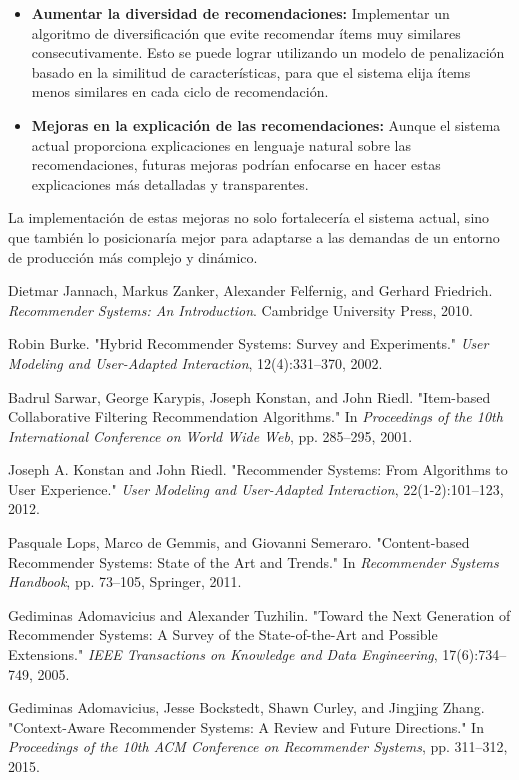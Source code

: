 \documentclass{llncs}
\begin{document}
\begin{itemize}
			\item \textbf{Aumentar la diversidad de recomendaciones:} Implementar un algoritmo de diversificación que evite recomendar ítems muy similares consecutivamente. Esto se puede lograr utilizando un modelo de penalización basado en la similitud de características, para que el sistema elija ítems menos similares en cada ciclo de recomendación.
		
		\item \textbf{Mejoras en la explicación de las recomendaciones:} Aunque el sistema actual proporciona explicaciones en lenguaje natural sobre las recomendaciones, futuras mejoras podrían enfocarse en hacer estas explicaciones más detalladas y transparentes.
		
	\end{itemize}
	
	La implementación de estas mejoras no solo fortalecería el sistema actual, sino que también lo posicionaría mejor para adaptarse a las demandas de un entorno de producción más complejo y dinámico.
	
	\begin{thebibliography}{9}
		 Dietmar Jannach, Markus Zanker, Alexander Felfernig, and Gerhard Friedrich. \textit{Recommender Systems: An Introduction}. Cambridge University Press, 2010.
		
		 Robin Burke. "Hybrid Recommender Systems: Survey and Experiments." \textit{User Modeling and User-Adapted Interaction}, 12(4):331–370, 2002.
		
		 Badrul Sarwar, George Karypis, Joseph Konstan, and John Riedl. "Item-based Collaborative Filtering Recommendation Algorithms." In \textit{Proceedings of the 10th International Conference on World Wide Web}, pp. 285–295, 2001.
		
		 Joseph A. Konstan and John Riedl. "Recommender Systems: From Algorithms to User Experience." \textit{User Modeling and User-Adapted Interaction}, 22(1-2):101–123, 2012.
		
		 Pasquale Lops, Marco de Gemmis, and Giovanni Semeraro. "Content-based Recommender Systems: State of the Art and Trends." In \textit{Recommender Systems Handbook}, pp. 73–105, Springer, 2011.
		
		 Gediminas Adomavicius and Alexander Tuzhilin. "Toward the Next Generation of Recommender Systems: A Survey of the State-of-the-Art and Possible Extensions." \textit{IEEE Transactions on Knowledge and Data Engineering}, 17(6):734–749, 2005.
		
		 Gediminas Adomavicius, Jesse Bockstedt, Shawn Curley, and Jingjing Zhang. "Context-Aware Recommender Systems: A Review and Future Directions." In \textit{Proceedings of the 10th ACM Conference on Recommender Systems}, pp. 311–312, 2015.
	\end{thebibliography}
	
	
\end{document}

